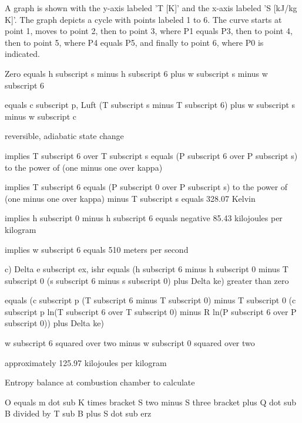 A graph is shown with the y-axis labeled 'T [K]' and the x-axis labeled 'S [kJ/kg K]'. The graph depicts a cycle with points labeled 1 to 6. The curve starts at point 1, moves to point 2, then to point 3, where P1 equals P3, then to point 4, then to point 5, where P4 equals P5, and finally to point 6, where P0 is indicated.

Zero equals h subscript s minus h subscript 6 plus w subscript s minus w subscript 6

equals c subscript p, Luft (T subscript s minus T subscript 6) plus w subscript s minus w subscript c

reversible, adiabatic state change

implies T subscript 6 over T subscript s equals (P subscript 6 over P subscript s) to the power of (one minus one over kappa)

implies T subscript 6 equals (P subscript 0 over P subscript s) to the power of (one minus one over kappa) minus T subscript s equals 328.07 Kelvin

implies h subscript 0 minus h subscript 6 equals negative 85.43 kilojoules per kilogram

implies w subscript 6 equals 510 meters per second

c) Delta e subscript ex, ishr equals (h subscript 6 minus h subscript 0 minus T subscript 0 (s subscript 6 minus s subscript 0) plus Delta ke) greater than zero

equals (c subscript p (T subscript 6 minus T subscript 0) minus T subscript 0 (c subscript p ln(T subscript 6 over T subscript 0) minus R ln(P subscript 6 over P subscript 0)) plus Delta ke)

w subscript 6 squared over two minus w subscript 0 squared over two

approximately 125.97 kilojoules per kilogram

Entropy balance at combustion chamber to calculate

O equals m dot sub K times bracket S two minus S three bracket plus Q dot sub B divided by T sub B plus S dot sub erz